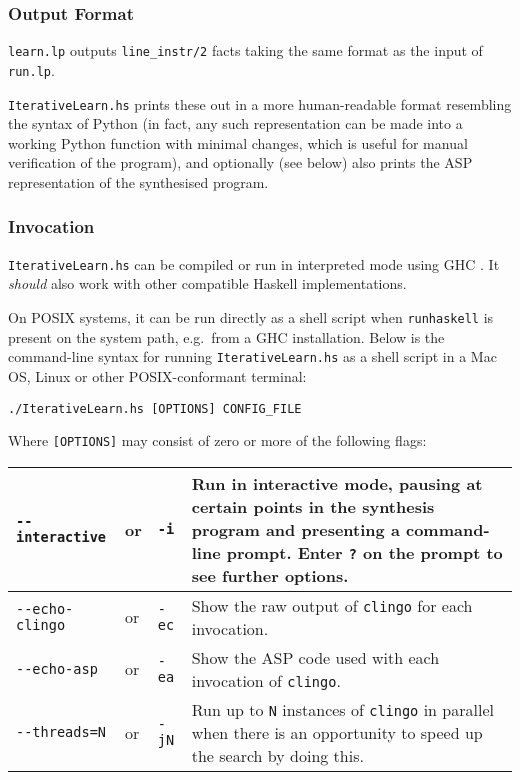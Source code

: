 \documentclass[a4paper,twoside,notitlepage,12pt]{article}
\begin{document}
\subsubsection{Output Format}

\verb|learn.lp| outputs \verb|line_instr/2| facts taking the same format as 
the input of \verb|run.lp|.

\verb|IterativeLearn.hs| prints these out in a more human-readable format 
resembling the syntax of Python (in fact, any such representation can be made 
into a working Python function with minimal changes, which is useful for 
manual verification of the program), and optionally (see below) also prints 
the ASP representation of the synthesised program.

\subsubsection{Invocation}

\verb|IterativeLearn.hs| can be compiled or run in interpreted mode using GHC 
\cite{ghc}. It \emph{should} also work with other compatible Haskell 
implementations.

On POSIX systems, it can be run directly as a shell script when 
\verb|runhaskell| is present on the system path, e.g.\ from a GHC 
installation. Below is the command-line syntax for running 
\verb|IterativeLearn.hs| as a shell script in a Mac OS, Linux or other 
POSIX-conformant terminal:

\begin{verbatim}
./IterativeLearn.hs [OPTIONS] CONFIG_FILE
\end{verbatim}

Where \verb|[OPTIONS]| may consist of zero or more of the following flags:

\begin{tabularx}{\textwidth}{|lll|X|}
\hline
\verb|--interactive| &or& \verb|-i|&
Run in interactive mode, pausing at certain points in the synthesis program 
and presenting a command-line prompt. Enter \verb|?| on the prompt to see 
further options. \\
\hline
\verb|--echo-clingo| &or& \verb|-ec| &
Show the raw output of \verb|clingo| for each invocation. \\
\hline
\verb|--echo-asp|    &or& \verb|-ea| &
Show the ASP code used with each invocation of \verb|clingo|. \\
\hline
\verb|--threads=N|   &or& \verb|-jN|&
Run up to \verb|N| instances of \verb|clingo| in parallel when there is an 
opportunity to speed up the search by doing this. \\
\hline
\end{tabularx}
\end{document}
